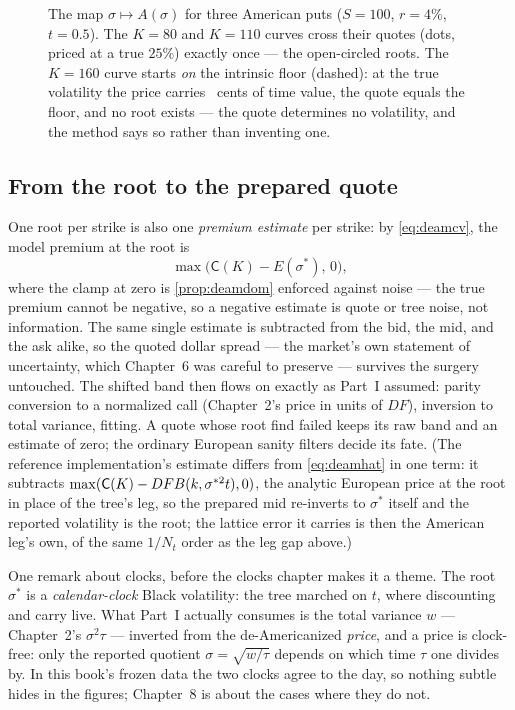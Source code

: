 \begin{figure}[htbp]
\centering
{}
\caption{The map $\sigma\mapsto A(\sigma)$ for three American puts
($S=100$, $r=4\%$, $t=0.5$).  The $K=80$ and $K=110$ curves cross
their quotes (dots, priced at a true $25\%$) exactly once --- the
open-circled roots.  The $K=160$ curve starts \emph{on} the intrinsic
floor (dashed): at the true volatility the price carries
\MacDeamRootPlateauGapCents\ cents of time value, the quote equals
the floor, and no root exists --- the quote determines no
volatility, and the method says so rather than inventing one.}
\label{fig:deamroot}
\end{figure}

\subsection{From the root to the prepared quote}

One root per strike is also one \emph{premium estimate} per strike:
by \eqref{eq:deamcv}, the model premium at the root is
\begin{equation}
\max\big(\mathsf{C}(K)-E(\sigma^*),\,0\big),
\label{eq:deamhat}
\end{equation}
where the clamp at zero is \cref{prop:deamdom} enforced against
noise --- the true premium cannot be negative, so a negative estimate
is quote or tree noise, not information.  The same single estimate is
subtracted from the bid, the mid, and the ask alike, so the quoted
dollar spread --- the market's own statement of uncertainty, which
Chapter~6 was careful to preserve --- survives the surgery untouched.
The shifted band then flows on exactly as Part~I assumed:
parity conversion to a normalized call (Chapter~2's price in units of
$DF$), inversion to total variance, fitting.  A quote whose root find failed keeps its raw band and an
estimate of zero; the ordinary European sanity filters decide its
fate.  (The reference implementation's estimate differs from
\eqref{eq:deamhat} in one term: it subtracts
$\max(\mathsf{C}(K)-DFB(k,\sigma^{*2}t),0)$, the analytic
European price at the root in place of the tree's leg, so the
prepared mid re-inverts to $\sigma^*$ itself and the reported
volatility is the root; the lattice error it carries is then the
American leg's own, of the same $1/N_t$ order as the leg gap above.)

One remark about clocks, before the clocks chapter makes it a theme.
The root $\sigma^*$ is a \emph{calendar-clock} Black volatility: the
tree marched on $t$, where discounting and carry live.  What Part~I
actually consumes is the total variance $w$ --- Chapter~2's
$\sigma^2\tau$ --- inverted from the de-Americanized \emph{price},
and a price is clock-free: only the
reported quotient $\sigma=\sqrt{w/\tau}$ depends on which time
$\tau$ one divides by.  In this book's frozen data the two clocks
agree to the day, so nothing subtle hides in the figures; Chapter~8
is about the cases where they do not.

